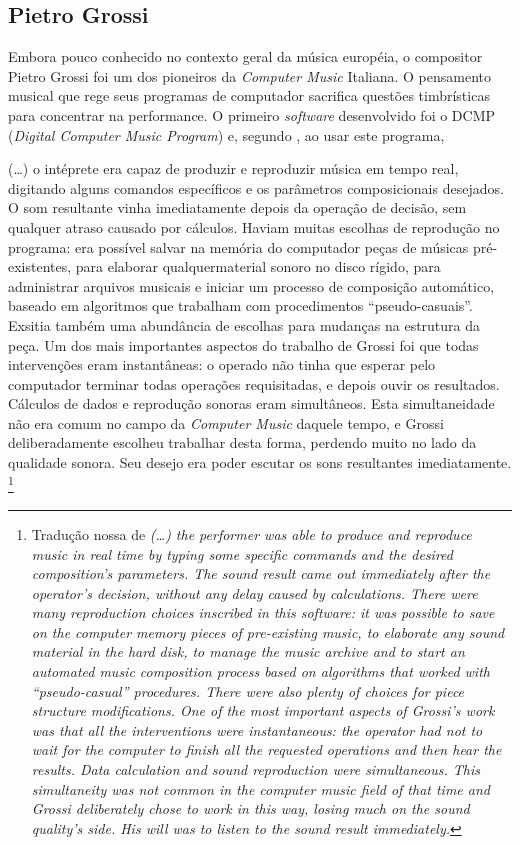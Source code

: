 \subsection{Pietro Grossi}\label{sec:grossi}

Embora pouco conhecido no contexto geral da música européia, o compositor Pietro Grossi foi  um dos pioneiros da \emph{Computer Music} Italiana. O pensamento musical que rege seus programas de computador sacrifica questões timbrísticas para concentrar na performance. O primeiro \emph{software} desenvolvido foi o DCMP (\emph{Digital Computer Music Program}) e, segundo \cite{mori_pietro_2015}, ao usar este programa,

\begin{citacao}
(\ldots) o intéprete era capaz de produzir e reproduzir música em tempo real, digitando alguns comandos específicos e os parâmetros composicionais desejados. O som resultante vinha imediatamente depois da operação de decisão, sem qualquer atraso causado por cálculos. Haviam muitas escolhas de reprodução no programa: era possível salvar na memória do computador peças de músicas pré-existentes, para elaborar qualquermaterial sonoro no disco rígido, para administrar arquivos musicais e iniciar um processo de composição automático, baseado em algoritmos que trabalham com procedimentos ``pseudo-casuais''. Exsitia também uma abundância de escolhas para mudanças na estrutura da peça. Um dos mais importantes aspectos do trabalho de Grossi foi que todas intervenções eram instantâneas: o operado não tinha que esperar pelo computador terminar todas operações requisitadas, e depois ouvir os resultados. Cálculos de dados e reprodução sonoras eram simultâneos. Esta simultaneidade não era comum no campo da \emph{Computer Music} daquele tempo, e Grossi deliberadamente escolheu trabalhar desta forma, perdendo muito no lado da qualidade sonora. Seu desejo era poder escutar os sons resultantes imediatamente. \cite[p.~126]{mori_pietro_2015} \footnote{Tradução nossa de \emph{(\ldots) the performer was able to produce and reproduce music in real time by typing some specific commands and the desired composition's parameters. The sound result came out immediately after the operator's decision, without any delay caused by calculations. There were many reproduction choices inscribed in this software: it was possible to save on the computer memory pieces of pre-existing music, to elaborate any sound material in the hard disk, to manage the music archive and to start an automated music composition process based on algorithms that worked with “pseudo-casual” procedures. There were also plenty of choices for piece structure modifications. One of the most important aspects of Grossi’s work was that all the interventions were instantaneous: the operator had not to wait for the computer to finish all the requested operations and then hear the results. Data calculation and sound reproduction were simultaneous. This simultaneity was not common in the computer music field of that time and Grossi deliberately chose to work in this way, losing much on the sound quality’s side. His will was to listen to the sound result immediately.}}
\end{citacao}

